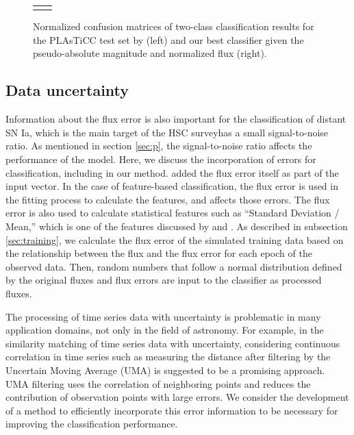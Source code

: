 \documentclass[proof]{pasj01}
\providecommand{\DIFadd}[1]{{\protect\color{blue} \sf #1}} %
\providecommand{\DIFdel}[1]{{\protect\color{red} \scriptsize #1}} %
\providecommand{\DIFaddbegin}{\protect\color{blue}} %
\providecommand{\DIFaddend}{\protect\color{black}} %
\providecommand{\DIFdelbegin}{\protect\color{red}} %
\providecommand{\DIFdelend}{\protect\color{black}} %
\providecommand{\DIFdelFL}[1]{\DIFdel{#1}} %
\providecommand{\DIFdelbeginFL}{} %
\providecommand{\DIFdelendFL}{} %
\newcommand{\DIFscaledelfig}{0.5}
\newlength{\DIFdelgraphicswidth} %
\newlength{\DIFdelgraphicsheight} %
\newcommand{\DIFaddincludegraphics}[2][]{{\color{blue}\fbox{\DIFOincludegraphics[#1]{#2}}}} %
\newcommand{\DIFdelincludegraphics}[2][]{%
\sbox{\DIFdelgraphicsbox}{\DIFOincludegraphics[#1]{#2}}%
\settoboxwidth{\DIFdelgraphicswidth}{\DIFdelgraphicsbox} %
\settoboxtotalheight{\DIFdelgraphicsheight}{\DIFdelgraphicsbox} %
\scalebox{\DIFscaledelfig}{%
\parbox[b]{\DIFdelgraphicswidth}{\usebox{\DIFdelgraphicsbox}\\[-\baselineskip] \rule{\DIFdelgraphicswidth}{0em}}\llap{\resizebox{\DIFdelgraphicswidth}{\DIFdelgraphicsheight}{%
\setlength{\unitlength}{\DIFdelgraphicswidth}%
\begin{picture}(1,1)%
\thicklines\linethickness{2pt} %
{\color[rgb]{1,0,0}\put(0,0){\framebox(1,1){}}}%
{\color[rgb]{1,0,0}\put(0,0){\line( 1,1){1}}}%
{\color[rgb]{1,0,0}\put(0,1){\line(1,-1){1}}}%
\end{picture}%
}\hspace*{3pt}}} %
} %
\DeclareRobustCommand{\DIFaddbegin}{\DIFOaddbegin \let\includegraphics\DIFaddincludegraphics} %
\DeclareRobustCommand{\DIFaddend}{\DIFOaddend \let\includegraphics\DIFOincludegraphics} %
\DeclareRobustCommand{\DIFdelbegin}{\DIFOdelbegin \let\includegraphics\DIFdelincludegraphics} %
\DeclareRobustCommand{\DIFdelend}{\DIFOaddend \let\includegraphics\DIFOincludegraphics} %
\DeclareRobustCommand{\DIFdelbeginFL}{\DIFOdelbeginFL \let\includegraphics\DIFdelincludegraphics} %
\DeclareRobustCommand{\DIFdelendFL}{\DIFOaddendFL \let\includegraphics\DIFOincludegraphics} %
\begin{document}
\begin{figure}[htbp]
\begin{tabular}{cc}
\begin{minipage}{0.5\hsize}
\begin{center}
            \end{center}
        \end{minipage}
    \end{tabular}  \caption{%
    Normalized confusion matrices of two-class classification results for the PLAsTiCC test set by \citet{boone19a} (left) and our best classifier given \DIFdelbeginFL \DIFdelFL{the }\DIFdelendFL pseudo-absolute magnitude and normalized flux (right).
    }%
    \label{fig:comp_plasticc_1st}
\end{figure}
%
%
%
%
\subsection{Data uncertainty}
%
Information about the flux error is also important for the classification of distant SN Ia, which is the main target of the HSC survey\DIFdelbegin \DIFdel{and }\DIFdelend \DIFaddbegin \DIFadd{. In addition, Type SN Ia }\DIFaddend has a small signal-to-noise ratio.
As mentioned in section \ref{sec:p}, the signal-to-noise ratio affects the performance of the model.
%
Here, we discuss the incorporation of errors for classification, including in our method.
\citet{charnock17a} added the flux error itself as part of the input vector.
In the case of feature-based classification, the flux error is used in the fitting process to calculate the features, and affects those errors.
The flux error is also used to calculate statistical features such as ``Standard Deviation / Mean,'' which is one of the features discussed by \citet{narayan18a} and \citet{Muthukrishna_2019}.
As described in subsection \ref{sec:training}, we calculate the flux error of the simulated training data based on the relationship between the flux and the flux error for each epoch of the observed data.
Then, random numbers that follow a normal distribution defined by the original fluxes and flux errors are input to the classifier as processed fluxes.

The processing of time series data with uncertainty is problematic in many application domains, not only in the field of astronomy.
For example, in the similarity matching of time series data with uncertainty,  considering continuous correlation in time series such as measuring the distance after filtering by the Uncertain Moving Average (UMA)\citep{Dallachiesa_2012} is suggested to be a promising approach.
UMA filtering uses the correlation of neighboring points and reduces the contribution of observation points with large errors.
We consider the development of a method to efficiently incorporate this error information to be necessary for improving the classification performance.
%
\end{document}
